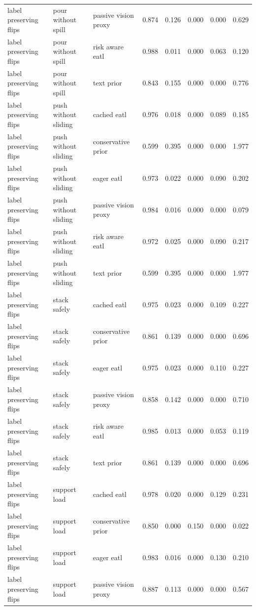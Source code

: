 \begin{longtable}{lllrrrrr}
label preserving flips & pour without spill & passive vision proxy & 0.874 & 0.126 & 0.000 & 0.000 & 0.629 \\
label preserving flips & pour without spill & risk aware eatl & 0.988 & 0.011 & 0.000 & 0.063 & 0.120 \\
label preserving flips & pour without spill & text prior & 0.843 & 0.155 & 0.000 & 0.000 & 0.776 \\
\midrule
label preserving flips & push without sliding & cached eatl & 0.976 & 0.018 & 0.000 & 0.089 & 0.185 \\
label preserving flips & push without sliding & conservative prior & 0.599 & 0.395 & 0.000 & 0.000 & 1.977 \\
label preserving flips & push without sliding & eager eatl & 0.973 & 0.022 & 0.000 & 0.090 & 0.202 \\
label preserving flips & push without sliding & passive vision proxy & 0.984 & 0.016 & 0.000 & 0.000 & 0.079 \\
label preserving flips & push without sliding & risk aware eatl & 0.972 & 0.025 & 0.000 & 0.090 & 0.217 \\
label preserving flips & push without sliding & text prior & 0.599 & 0.395 & 0.000 & 0.000 & 1.977 \\
\midrule
label preserving flips & stack safely & cached eatl & 0.975 & 0.023 & 0.000 & 0.109 & 0.227 \\
label preserving flips & stack safely & conservative prior & 0.861 & 0.139 & 0.000 & 0.000 & 0.696 \\
label preserving flips & stack safely & eager eatl & 0.975 & 0.023 & 0.000 & 0.110 & 0.227 \\
label preserving flips & stack safely & passive vision proxy & 0.858 & 0.142 & 0.000 & 0.000 & 0.710 \\
label preserving flips & stack safely & risk aware eatl & 0.985 & 0.013 & 0.000 & 0.053 & 0.119 \\
label preserving flips & stack safely & text prior & 0.861 & 0.139 & 0.000 & 0.000 & 0.696 \\
\midrule
label preserving flips & support load & cached eatl & 0.978 & 0.020 & 0.000 & 0.129 & 0.231 \\
label preserving flips & support load & conservative prior & 0.850 & 0.000 & 0.150 & 0.000 & 0.022 \\
label preserving flips & support load & eager eatl & 0.983 & 0.016 & 0.000 & 0.130 & 0.210 \\
label preserving flips & support load & passive vision proxy & 0.887 & 0.113 & 0.000 & 0.000 & 0.567 \\

\end{longtable}
